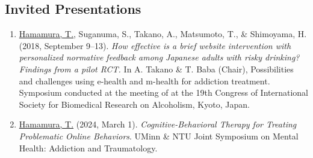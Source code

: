 \documentclass[a4paper]{article}
\begin{document}
\subsection{Invited Presentations}
\begin{enumerate}
	\item \underline{Hamamura, T.}, Suganuma, S., Takano, A., Matsumoto, T., \& Shimoyama, H. (2018, September 9--13). \textit{How effective is a brief website intervention with personalized normative feedback among Japanese adults with risky drinking? Findings from a pilot RCT.} In A. Takano \& T. Baba (Chair), Possibilities and challenges using e-health and m-health for addiction treatment. Symposium conducted at the meeting of at the 19th Congress of International Society for Biomedical Research on Alcoholism, Kyoto, Japan.
	\item \underline{Hamamura, T.} (2024, March 1). \textit{Cognitive-Behavioral Therapy for Treating Problematic Online Behaviors}. UMinn \& NTU Joint Symposium on Mental Health: Addiction and Traumatology.
\end{enumerate}
\end{document}
